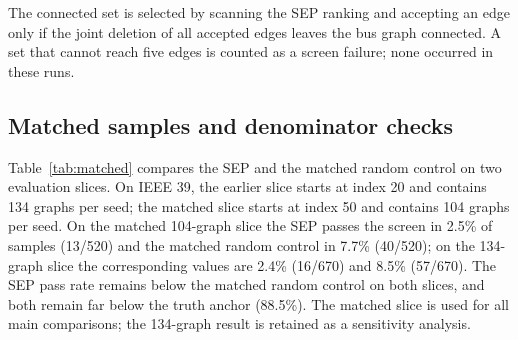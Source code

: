 \begin{table}[!htbp]
\centering
\caption{Connectivity-preserving control (five seeds, 50 samples per seed; 250 samples per system). Each sample is classified as feasible, island, non-converged, or voltage violation; the pass column and the three failure columns sum to $n$. The connected rows use a five-edge set selected from the same SEP ranking under joint connectivity. The connected set reached five edges in 250/250 samples for every system.}
\label{tab:conn}
\scriptsize
{}
\begin{flushleft}
\footnotesize
The connected set is selected by scanning the SEP ranking and accepting an edge only if the joint deletion of all accepted edges leaves the bus graph connected. A set that cannot reach five edges is counted as a screen failure; none occurred in these runs.
\end{flushleft}
\end{table}



\subsection{Matched samples and denominator checks}\label{matched_samples}

Table~\ref{tab:matched} compares the SEP and the matched random control on two evaluation slices. On IEEE 39, the earlier slice starts at index 20 and contains 134 graphs per seed; the matched slice starts at index 50 and contains 104 graphs per seed. On the matched 104-graph slice the SEP passes the screen in 2.5\% of samples (13/520) and the matched random control in 7.7\% (40/520); on the 134-graph slice the corresponding values are 2.4\% (16/670) and 8.5\% (57/670). The SEP pass rate remains below the matched random control on both slices, and both remain far below the truth anchor (88.5\%). The matched slice is used for all main comparisons; the 134-graph result is retained as a sensitivity analysis.

